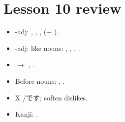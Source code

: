 \section*{Lesson 10 review}
\begin{itemize}
  \item {}-adj: , , ,  (+ ).
  \item {}-adj: like nouns: , , , .
  \item {} $\to$ , .
  \item Before nouns: , .
  \item X  /です; soften dislikes.
  \item Kanji: .
\end{itemize}
